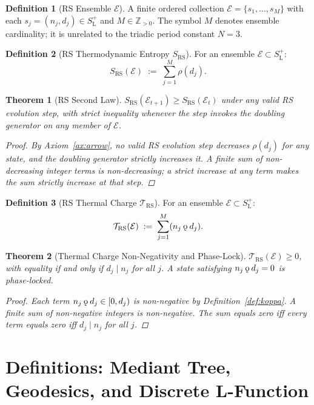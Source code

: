 \documentclass[11pt, letterpaper]{article}
\newcommand{\Z}{\mathbb{Z}}
\newcommand{\SLpos}{S_{\mathrm{L}}^{+}}
\newcommand{\SRS}{S_{\mathrm{RS}}}
\newcommand{\TRS}{\mathcal{T}_{\mathrm{RS}}}
\newcommand{\Ens}{\mathcal{E}}
\newcommand{\rank}{\rho}
\newcommand{\koppa}{\mathbin{\text{\rm\k{o}}}}
\theoremstyle{definition}
\newtheorem{definition}{Definition}[section]
\theoremstyle{plain}
\newtheorem{theorem}{Theorem}[section]
\begin{document}
\begin{definition}[RS Ensemble $\Ens$]\label{def:ensemble}
A finite ordered collection $\Ens=\{s_1,\ldots,s_M\}$ with each
$s_j=(n_j,d_j)\in\SLpos$ and $M\in\Z_{>0}$.  The symbol $M$ denotes
ensemble cardinality; it is unrelated to the triadic period constant $N=3$.
\end{definition}

\begin{definition}[RS Thermodynamic Entropy $\SRS$]\label{def:entropy}
For an ensemble $\Ens\subset\SLpos$:
\[
\SRS(\Ens)\;:=\;\sum_{j=1}^{M}\rank(d_j).
\]
\end{definition}

\begin{theorem}[RS Second Law]\label{thm:secondlaw}
$\SRS(\Ens_{t+1})\geq\SRS(\Ens_t)$ under any valid RS evolution step,
with strict inequality whenever the step invokes the doubling generator
on any member of $\Ens$.
\begin{proof}
By Axiom~\ref{ax:arrow}, no valid RS evolution step decreases $\rank(d_j)$
for any state, and the doubling generator strictly increases it.  A finite
sum of non-decreasing integer terms is non-decreasing; a strict increase at
any term makes the sum strictly increase at that step.
\end{proof}
\end{theorem}

\begin{definition}[RS Thermal Charge $\TRS$]\label{def:thermalcharge}
For an ensemble $\Ens\subset\SLpos$:
\[
\TRS(\Ens)\;:=\;\sum_{j=1}^{M}(n_j\koppa d_j).
\]
\end{definition}

\begin{theorem}[Thermal Charge Non-Negativity and Phase-Lock]
\label{thm:thermalcharge}
$\TRS(\Ens)\geq 0$, with equality if and only if $d_j\mid n_j$ for all $j$.
A state satisfying $n_j\koppa d_j=0$ is phase-locked.
\begin{proof}
Each term $n_j\koppa d_j\in[0,d_j)$ is non-negative by
Definition~\ref{def:koppa}.  A finite sum of non-negative integers is
non-negative.  The sum equals zero iff every term equals zero iff
$d_j\mid n_j$ for all $j$.
\end{proof}
\end{theorem}


\section{Definitions: Mediant Tree, Geodesics, and Discrete L-Function}
\label{sec:mediant}
\end{document}

